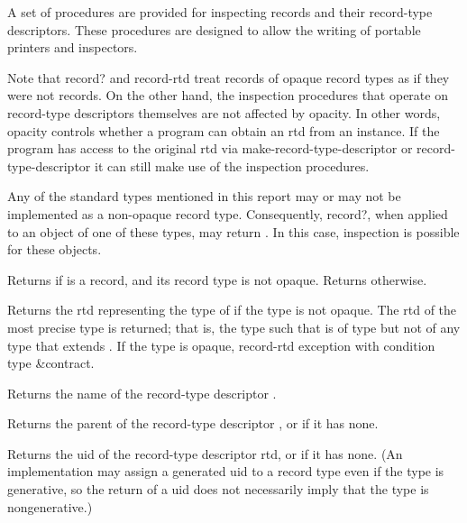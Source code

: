 A set of procedures are provided for inspecting records and their
record-type descriptors. These procedures are designed to allow the
writing of portable printers and inspectors.

Note that {\cf record?} and {\cf record-rtd} treat records of opaque
record types as if they were not records. On the other hand, the
inspection procedures that operate on record-type descriptors
themselves are not affected by opacity. In other words, opacity
controls whether a program can obtain an rtd from an instance. If the
program has access to the original rtd via {\cf
  make-record-type-descriptor} or {\cf record-type-descriptor} it can
still make use of the inspection procedures.

Any of the standard types mentioned in this report may or may not be
implemented as a non-opaque record type.  Consequently, {\cf record?},
when applied to an object of one of these types, may return
\schtrue{}.  In this case, inspection is possible for these objects.

\begin{entry}{%
}
   
Returns \schtrue{} if  is a record, and its record type is
not opaque. Returns \schfalse{} otherwise.  
\end{entry}

\begin{entry}{%
}
   
Returns the rtd representing the type of  if the type is not
opaque. The rtd of the most precise type is returned; that is, the
type  such that  is of type  but not of any
type that extends .  If the type is opaque, {\cf record-rtd} exception
with condition type {\cf\&contract}.
\end{entry}

\begin{entry}{%
}
   
Returns the name of the record-type descriptor .
\end{entry}   

\begin{entry}{%
}
   
Returns the parent of the record-type descriptor , or
\schfalse{} if it has none.
\end{entry}

\begin{entry}{%
}
   
Returns the uid of the record-type descriptor rtd, or \schfalse{} if it has none.
(An implementation may assign a generated uid to a record type even if the
type is generative, so the return of a uid does not necessarily imply that
the type is nongenerative.)
\end{entry}


